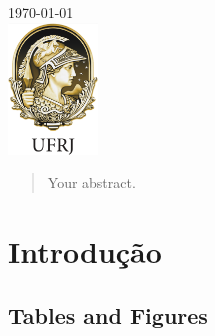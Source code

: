 \documentclass[12pt]{article}
\begin{document}
\begin{titlepage}
{\large \today}\\[2cm] %


\includegraphics[height=3.5cm]{logos/ufrj-logo.png}\\[1cm]
 

\vfill %

\end{titlepage}


\begin{abstract}
Your abstract.
\end{abstract}

\section{Introdução}

 



\subsection{Tables and Figures}


\end{document}

